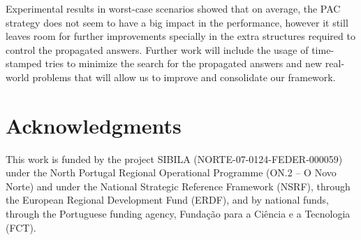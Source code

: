 \documentclass{llncs}
\begin{document}
Experimental results in worst-case scenarios showed that on average,
the PAC strategy does not seem to have a big impact in the
performance, however it still leaves room for further improvements
specially in the extra structures required to control the propagated
answers. Further work will include the usage of time-stamped tries to
minimize the search for the propagated answers and new real-world
problems that will allow us to improve and consolidate our framework.


\section*{Acknowledgments}

This work is funded by the project SIBILA (NORTE-07-0124-FEDER-000059)
under the North Portugal Regional Operational Programme (ON.2 – O Novo
Norte) and under the National Strategic Reference Framework (NSRF),
through the European Regional Development Fund (ERDF), and by national
funds, through the Portuguese funding agency, Fundação para a Ciência
e a Tecnologia (FCT).






\end{document}
